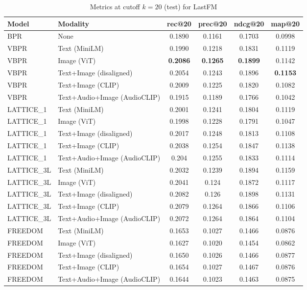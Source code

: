 \begin{table}[H]
    \centering
    \begin{adjustbox}{max width=\textwidth}
    \begin{tabular}{|l|l|c|c|c|c|}
    \hline
    	\textbf{Model} & \textbf{Modality} & \textbf{rec@20} & \textbf{prec@20} & \textbf{ndcg@20} & \textbf{map@20} \\
    \hline
    BPR & None & 0.1890 & 0.1161 & 0.1703 & 0.0998 \\
    \hline
    VBPR & Text (MiniLM) & 0.1990 & 0.1218 & 0.1831 & 0.1119 \\
    \hline
    VBPR & Image (ViT) & \textbf{0.2086} & \textbf{0.1265} & \textbf{0.1899} & 0.1142 \\
    \hline
    VBPR & Text+Image (disaligned) & 0.2054 & 0.1243 & 0.1896 & \textbf{0.1153} \\
    \hline
    VBPR & Text+Image (CLIP) & 0.2009 & 0.1225 & 0.1820 & 0.1082 \\
    \hline
    VBPR & Text+Audio+Image (AudioCLIP) & 0.1915 & 0.1189 & 0.1766 & 0.1042 \\
    \hline
    LATTICE\_1 & Text (MiniLM) & 0.2001 & 0.1241 & 0.1804 & 0.1119 \\
    \hline
    LATTICE\_1 & Image (ViT) & 0.1998 & 0.1228 & 0.1791 & 0.1047 \\
    \hline
    LATTICE\_1 & Text+Image (disaligned) & 0.2017 & 0.1248 & 0.1813 & 0.1108 \\
    \hline
    LATTICE\_1 & Text+Image (CLIP) & 0.2038 & 0.1254 & 0.1847 & 0.1138 \\
    \hline
    LATTICE\_1 & Text+Audio+Image (AudioCLIP) & 0.204 & 0.1255 & 0.1833 & 0.1114 \\
    \hline
    LATTICE\_3L & Text (MiniLM) & 0.2032 & 0.1239 & 0.1894 & 0.1159 \\
    \hline
    LATTICE\_3L & Image (ViT) & 0.2041 & 0.124 & 0.1872 & 0.1117 \\
    \hline
    LATTICE\_3L & Text+Image (disaligned) & 0.2082 & 0.126 & 0.1898 & 0.1131 \\
    \hline
    LATTICE\_3L & Text+Image (CLIP) & 0.2079 & 0.1264 & 0.1866 & 0.1106 \\
    \hline
    LATTICE\_3L & Text+Audio+Image (AudioCLIP) & 0.2072 & 0.1264 & 0.1864 & 0.1104 \\
    \hline
    FREEDOM & Text (MiniLM) & 0.1653 & 0.1027 & 0.1466 & 0.0876 \\
    \hline
    FREEDOM & Image (ViT) & 0.1627 & 0.1020 & 0.1454 & 0.0862 \\
    \hline
    FREEDOM & Text+Image (disaligned) & 0.1650 & 0.1026 & 0.1466 & 0.0877 \\
    \hline
    FREEDOM & Text+Image (CLIP) & 0.1654 & 0.1027 & 0.1467 & 0.0876 \\
    \hline
    FREEDOM & Text+Audio+Image (AudioCLIP) & 0.1644 & 0.1023 & 0.1463 & 0.0875 \\
    \hline
    \end{tabular}
    \end{adjustbox}
    \caption{Metrics at cutoff $k=20$ (test) for LastFM}
    \label{tab:metrics_lastfm_k20}
\end{table}

